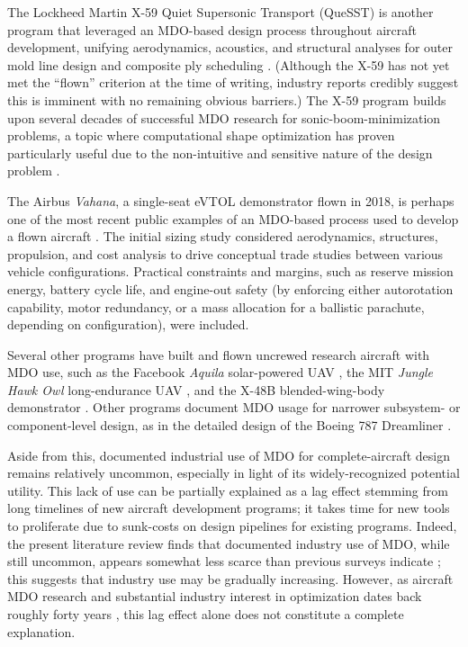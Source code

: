 \documentclass[12pt,vi,oneside]{report}
\begin{document}
    The Lockheed Martin X-59 Quiet Supersonic Transport (QueSST) is another program that leveraged an MDO-based design process throughout aircraft development, unifying aerodynamics, acoustics, and structural analyses for outer mold line design and composite ply scheduling \cite{x59_nasa_nas, x59_nasa_sc19, x59_compositeworld}. (Although the X-59 has not yet met the ``flown'' criterion at the time of writing, industry reports credibly suggest this is imminent with no remaining obvious barriers.) The X-59 program builds upon several decades of successful MDO research for sonic-boom-minimization problems, a topic where computational shape optimization has proven particularly useful due to the non-intuitive and sensitive nature of the design problem \cite{choi_multifidelity_2008}.

    The Airbus \textit{Vahana}, a single-seat eVTOL demonstrator flown in 2018, is perhaps one of the most recent public examples of an MDO-based process used to develop a flown aircraft \cite{vahana_1, vahana_2, vahana_code}. The initial sizing study considered aerodynamics, structures, propulsion, and cost analysis to drive conceptual trade studies between various vehicle configurations. Practical constraints and margins, such as reserve mission energy, battery cycle life, and engine-out safety (by enforcing either autorotation capability, motor redundancy, or a mass allocation for a ballistic parachute, depending on configuration), were included.

    Several other programs have built and flown uncrewed research aircraft with MDO use, such as the Facebook \textit{Aquila} solar-powered UAV \cite{fbhale}, the MIT \textit{Jungle Hawk Owl} long-endurance UAV \cite{jho}, and the X-48B blended-wing-body demonstrator \cite{wakayama_2000_blended, liebeck_blendedwingbody_1998, liebeck2004design}. Other programs document MDO usage for narrower subsystem- or component-level design, as in the detailed design of the Boeing 787 Dreamliner \cite{agte_mdo_2010}.

    Aside from this, documented industrial use of MDO for complete-aircraft design remains relatively uncommon, especially in light of its widely-recognized potential utility. This lack of use can be partially explained as a lag effect stemming from long timelines of new aircraft development programs; it takes time for new tools to proliferate due to sunk-costs on design pipelines for existing programs. Indeed, the present literature review finds that documented industry use of MDO, while still uncommon, appears somewhat less scarce than previous surveys indicate \cite{kroo_multidisciplinary_1997, agte_mdo_2010, ashley_making_1982, haftka_multidisciplinary_1997, gazaix_industrialization_2017}; this suggests that industry use may be gradually increasing. However, as aircraft MDO research and substantial industry interest in optimization dates back roughly forty years \cite{vanderplaats_automated_1976, ashley_making_1982}, this lag effect alone does not constitute a complete explanation.
\end{document}
